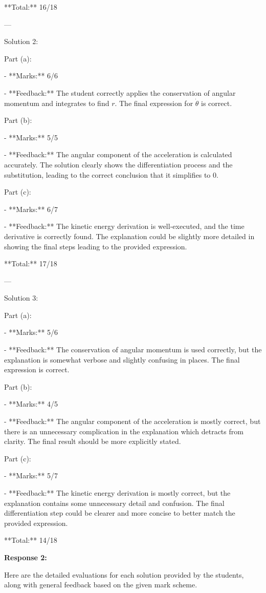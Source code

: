 \documentclass[a4paper,11pt]{article}
\begin{document}
**Total:** 16/18

---

Solution 2:

Part (a):

- **Marks:** 6/6

- **Feedback:** The student correctly applies the conservation of angular momentum and integrates to find \(r\). The final expression for \(\dot{\theta}\) is correct.

Part (b):

- **Marks:** 5/5

- **Feedback:** The angular component of the acceleration is calculated accurately. The solution clearly shows the differentiation process and the substitution, leading to the correct conclusion that it simplifies to 0.

Part (c):

- **Marks:** 6/7

- **Feedback:** The kinetic energy derivation is well-executed, and the time derivative is correctly found. The explanation could be slightly more detailed in showing the final steps leading to the provided expression.

**Total:** 17/18

---

Solution 3:

Part (a):

- **Marks:** 5/6

- **Feedback:** The conservation of angular momentum is used correctly, but the explanation is somewhat verbose and slightly confusing in places. The final expression is correct.

Part (b):

- **Marks:** 4/5

- **Feedback:** The angular component of the acceleration is mostly correct, but there is an unnecessary complication in the explanation which detracts from clarity. The final result should be more explicitly stated.

Part (c):

- **Marks:** 5/7

- **Feedback:** The kinetic energy derivation is mostly correct, but the explanation contains some unnecessary detail and confusion. The final differentiation step could be clearer and more concise to better match the provided expression.

**Total:** 14/18

\bigskip
\textbf{Response 2:}

Here are the detailed evaluations for each solution provided by the students, along with general feedback based on the given mark scheme.
\end{document}
